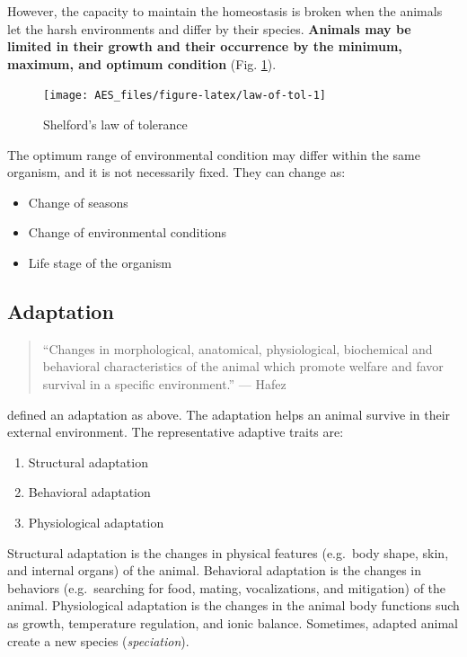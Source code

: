 \documentclass[]{book}
\providecommand{\tightlist}{%
  \setlength{\itemsep}{0pt}\setlength{\parskip}{0pt}}
\begin{document}
However, the capacity to maintain the homeostasis is broken when the
animals let the harsh environments and differ by their species.
\textbf{Animals may be limited in their growth and their occurrence by
the minimum, maximum, and optimum condition} \citep{shelford} (Fig.
\ref{fig:law-of-tol}).

\begin{figure}

{\centering \texttt{[image: AES\_files/figure-latex/law-of-tol-1]} 

}

\caption{Shelford's law of tolerance}\label{fig:law-of-tol}
\end{figure}

The optimum range of environmental condition may differ within the same
organism, and it is not necessarily fixed. They can change as:

\begin{itemize}
\tightlist
\item
  Change of seasons
\item
  Change of environmental conditions
\item
  Life stage of the organism
\end{itemize}

\subsection{Adaptation}\label{adaptation}

\begin{quote}
``Changes in morphological, anatomical, physiological, biochemical and
behavioral characteristics of the animal which promote welfare and favor
survival in a specific environment.'' --- Hafez
\end{quote}

\citet{hafez1968adaptation} defined an adaptation as above. The
adaptation helps an animal survive in their external environment. The
representative adaptive traits are:

\begin{enumerate}
\def\labelenumi{\arabic{enumi}.}
\tightlist
\item
  Structural adaptation
\item
  Behavioral adaptation
\item
  Physiological adaptation
\end{enumerate}

Structural adaptation is the changes in physical features (e.g.~body
shape, skin, and internal organs) of the animal. Behavioral adaptation
is the changes in behaviors (e.g.~searching for food, mating,
vocalizations, and mitigation) of the animal. Physiological adaptation
is the changes in the animal body functions such as growth, temperature
regulation, and ionic balance. Sometimes, adapted animal create a new
species (\emph{speciation}).
\end{document}
